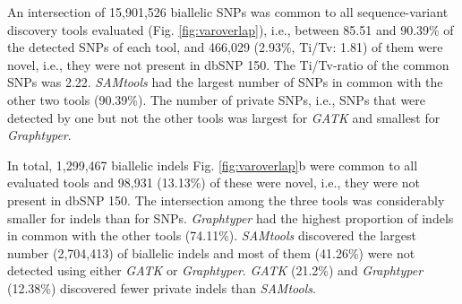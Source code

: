 \documentclass[../main.tex]{subfiles}
\begin{document}
An intersection of 15,901,526 biallelic SNPs was common to all sequence-variant discovery tools evaluated (Fig. \ref{fig:varoverlap}), i.e., between 85.51 and 90.39\% of the detected SNPs of each tool, and 466,029 (2.93\%, Ti/Tv: 1.81) of them were novel, i.e., they were not present in dbSNP 150. The Ti/Tv-ratio of the common SNPs was 2.22. \emph{SAMtools} had the largest number of SNPs in common with the other two tools (90.39\%). The number of private SNPs, i.e., SNPs that were detected by one but not the other tools was largest for \emph{GATK} and smallest for \emph{Graphtyper}.

In total, 1,299,467 biallelic indels Fig. \ref{fig:varoverlap}b were common to all evaluated tools and 98,931 (13.13\%) of these were novel, 
i.e., they were not present in dbSNP 150. The intersection among the three tools was considerably smaller for indels than for SNPs. 
\emph{Graphtyper} had the highest proportion of indels in common with the other tools (74.11\%). 
\emph{SAMtools} discovered the largest number (2,704,413) of biallelic indels and most of them (41.26\%) were not detected using either \emph{GATK} or \emph{Graphtyper}. 
\emph{GATK} (21.2\%) and \emph{Graphtyper} (12.38\%) discovered fewer private indels than \emph{SAMtools}.

\newpage
\end{document}
